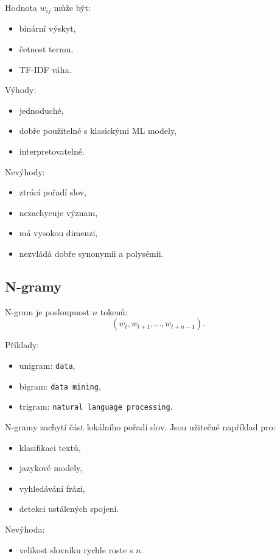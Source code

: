 Hodnota $w_{ij}$ může být:
\begin{itemize}
    \item binární výskyt,
    \item četnost termu,
    \item TF-IDF váha.
\end{itemize}

Výhody:
\begin{itemize}
    \item jednoduché,
    \item dobře použitelné s klasickými ML modely,
    \item interpretovatelné.
\end{itemize}

Nevýhody:
\begin{itemize}
    \item ztrácí pořadí slov,
    \item nezachycuje význam,
    \item má vysokou dimenzi,
    \item nezvládá dobře synonymii a polysémii.
\end{itemize}

\subsection{N-gramy}

N-gram je posloupnost $n$ tokenů:
\[
(w_t,w_{t+1},\ldots,w_{t+n-1}).
\]

Příklady:
\begin{itemize}
    \item unigram: \texttt{data},
    \item bigram: \texttt{data mining},
    \item trigram: \texttt{natural language processing}.
\end{itemize}

N-gramy zachytí část lokálního pořadí slov. Jsou užitečné například pro:
\begin{itemize}
    \item klasifikaci textů,
    \item jazykové modely,
    \item vyhledávání frází,
    \item detekci ustálených spojení.
\end{itemize}

Nevýhoda:
\begin{itemize}
    \item velikost slovníku rychle roste s $n$.
\end{itemize}

